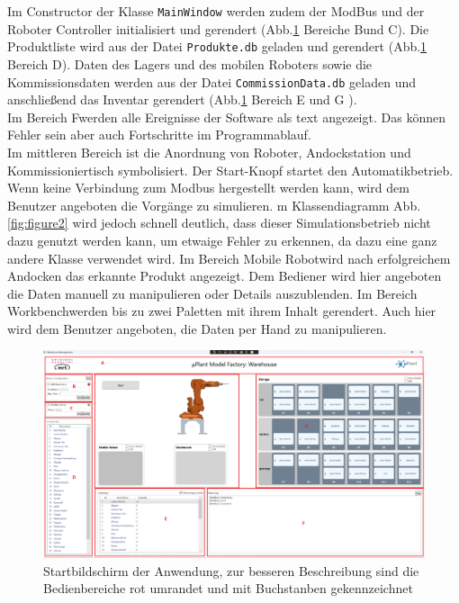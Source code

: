     Im Constructor der Klasse \verb|MainWindow| werden zudem der ModBus und der Roboter Controller initialisiert
    und gerendert (Abb.\ref{fig:figure} Bereiche \glqq B\grqq und \glqq C\grqq).
    Die Produktliste wird aus der Datei \verb|Produkte.db| geladen und gerendert (Abb.\ref{fig:figure} Bereich \glqq D\grqq).
    Daten des Lagers und des mobilen Roboters sowie die Kommissionsdaten werden aus der Datei \verb|CommissionData.db|
    geladen und anschließend das Inventar gerendert (Abb.\ref{fig:figure} Bereich \glqq E \grqq und \glqq G \grqq).
    \\
    Im Bereich \glqq F\grqq werden alle Ereignisse der Software als text angezeigt.
    Das können Fehler sein aber auch Fortschritte im Programmablauf.
    \\
    Im mittleren Bereich ist die Anordnung von Roboter, Andockstation und Kommissioniertisch symbolisiert.
    Der \glqq Start\grqq -Knopf startet den Automatikbetrieb.
    Wenn keine Verbindung zum Modbus hergestellt werden kann, wird dem Benutzer angeboten die Vorgänge zu simulieren.
    m Klassendiagramm Abb.\ref{fig:figure2} wird jedoch schnell deutlich, dass dieser Simulationsbetrieb nicht dazu genutzt werden
    kann, um etwaige Fehler zu erkennen, da dazu eine ganz andere Klasse verwendet wird.
    Im Bereich \glqq Mobile Robot\grqq wird nach erfolgreichem Andocken das erkannte Produkt angezeigt.
    Dem Bediener wird hier angeboten die Daten manuell zu manipulieren oder Details auszublenden.
    Im Bereich \glqq Workbench\grqq werden bis zu zwei Paletten mit ihrem Inhalt gerendert.
    Auch hier wird dem Benutzer angeboten, die Daten per Hand zu manipulieren.

    \begin{figure}[h]
        \caption[Ansicht des Startbildschirms]
        {\small Startbildschirm der Anwendung, zur besseren Beschreibung sind die Bedienbereiche rot umrandet und mit
        Buchstanben gekennzeichnet}\label{fig:figure}
        \includegraphics[width = \textwidth ]{Bilder/LV_Startbildschirm}
        \centering
    \end{figure}

